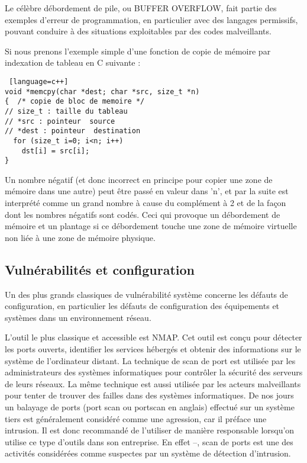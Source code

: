Le célèbre débordement de pile, ou BUFFER OVERFLOW, fait partie des exemples d'erreur de programmation, en particulier avec des langages permissifs,  pouvant conduire à des situations exploitables par des codes malveillants.

Si nous prenons l'exemple simple d'une fonction de copie de mémoire par indexation de tableau en C suivante :

\begin{lstlisting} [language=c++]
void *memcpy(char *dest; char *src, size_t *n)
{  /* copie de bloc de memoire */
// size_t : taille du tableau
// *src : pointeur  source
// *dest : pointeur  destination
  for (size_t i=0; i<n; i++)
    dst[i] = src[i];
}
\end{lstlisting} 

Un nombre négatif (et donc incorrect en principe pour copier une zone de mémoire dans une autre) peut être passé en valeur dans 'n', et par la suite est interprété comme un grand nombre à cause du complément à 2 et de la façon dont les nombres négatifs sont codés. Ceci qui provoque un débordement de mémoire et un plantage si ce débordement touche une zone de mémoire virtuelle non liée à une zone de mémoire physique.


\subsection{Vulnérabilités et configuration}

Un des plus grands classiques de vulnérabilité système concerne  les défauts de configuration, en particulier les défauts de configuration des équipements et systèmes dans un environnement réseau.

L'outil le plus classique et accessible est NMAP.  Cet outil est conçu pour détecter les ports ouverts, identifier les services hébergés et obtenir des informations sur le système  de l'ordinateur distant. 
La technique de scan de port est utilisée par les administrateurs des systèmes informatiques pour contrôler la sécurité des serveurs de leurs réseaux. La même technique est aussi utilisée par les acteurs malveillants pour tenter de trouver des failles dans des systèmes informatiques. De nos jours un balayage de ports (port scan ou portscan en anglais) effectué sur un système tiers est généralement considéré comme une agression, car il préface une intrusion. Il est donc recommandé de l'utiliser de manière responsable lorsqu'on utilise ce type d'outils dans son entreprise. En effet --, 
scan de ports est une des activités considérées comme suspectes par un système de détection d'intrusion. 





